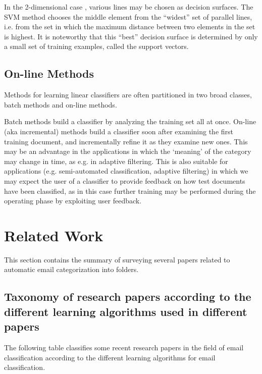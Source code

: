 In the 2-dimensional case , various lines may be chosen as decision surfaces. 
The SVM method chooses the middle element from the ``widest'' set of parallel 
lines, i.e. from the set in which the maximum distance between two elements in 
the set is highest. It is noteworthy that this ``best'' decision surface is 
determined by only a small set of training examples, called the support vectors.

\subsection{On-line Methods}
Methods for learning linear classifiers are often partitioned in two broad 
classes, batch methods and on-line methods.

Batch methods build a classifier by analyzing the training set all at once. 
On-line (aka incremental) methods build a classifier soon after examining 
the first training document, and incrementally refine it as they examine new ones. 
This may be an advantage in the applications in which the `meaning' of the 
category may change in time, as e.g. in adaptive filtering. This is also suitable 
for applications (e.g. semi-automated classification, adaptive filtering) in 
which we may expect the user of a classifier to provide feedback on how test 
documents have been classified, as in this case further training may be performed 
during the operating phase by exploiting user feedback.

\newpage
\section{Related Work}
This section contains the summary of surveying several papers related to automatic email categorization into folders.

\label{sec:related_work}

\subsection{Taxonomy of research papers according to the different learning algorithms used in different papers}
The following table classifies some recent research papers in the field of email 
classification according to the different learning algorithms for email classification.

